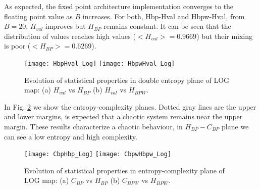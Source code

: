 As expected, the fixed point architecture implementation converges to the floating point value as $B$ increases.
For both, Hbp-Hval and Hbpw-Hval, from $B=20$, $H_{val}$ improves but $H_{BP}$ remains constant.
It can be seen that the distribution of values reaches high values ($<H_{val}>=0.9669$) but their mixing is poor ($<H_{BP}>=0.6269$).

\begin{figure}
	\texttt{[image: HbpHval\_Log]}
	\texttt{[image: HbpwHval\_Log]}
	\caption{Evolution of statistical properties in double entropy plane of LOG map: (a) $H_{val}$ vs $H_{BP}$ (b) $H_{val}$ vs $H_{BPW}$.}
	\label{fig:LOG_HH}
\end{figure}

In Fig. \ref{fig:LOG_HC} we show the entropy-complexity planes.
Dotted gray lines are the upper and lower margins, is expected that a chaotic system remains near the upper margin.
These results characterize a chaotic behaviour, in $H_{BP}-C_{BP}$ plane we can see a low entropy and high complexity.

\begin{figure}
	\texttt{[image: CbpHbp\_Log]}
	\texttt{[image: CbpwHbpw\_Log]}
	\caption{Evolution of statistical properties in entropy-complexity plane of LOG map: (a) $C_{BP}$ vs $H_{BP}$ (b) $C_{BPW}$ vs $H_{BPW}$.}
	\label{fig:LOG_HC}
\end{figure}

